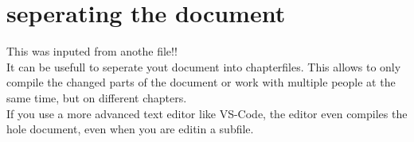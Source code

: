 \chapter{seperating the document}
	This was inputed from anothe file!!
	\vspace{4em}\\
	It can be usefull to seperate yout document into chapterfiles. This allows to only compile  the changed parts of the document or work with
	multiple people at the same time, but on different chapters.\\
	If you use a more advanced text editor like VS-Code, the editor even compiles the hole document, even when you are editin a subfile.